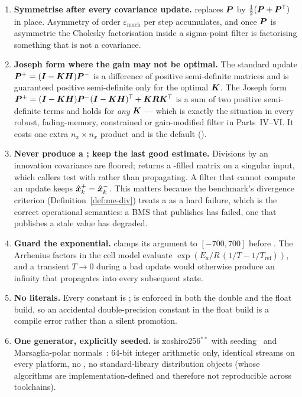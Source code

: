 \begin{enumerate}[leftmargin=*,topsep=2pt,itemsep=3pt]
\item \textbf{Symmetrise after every covariance update.}  replaces $\bm{P}$ by
$\frac12(\bm{P}+\bm{P}^{\mathsf{T}})$ in place. Asymmetry of order $\varepsilon_{\text{mach}}$ per step accumulates,
and once $\bm{P}$ is asymmetric the Cholesky factorisation inside a sigma-point filter is factorising
something that is not a covariance.

\item \textbf{Joseph form where the gain may not be optimal.} The standard update
$\bm{P}^{+} = (\bm{I}-\bm{K}\bm{H})\bm{P}^{-}$ is a difference of positive semi-definite matrices and is guaranteed
positive semi-definite only for the optimal $\bm{K}$. The Joseph
form~\cite{bucyjoseph1968} $\bm{P}^{+} = (\bm{I}-\bm{K}\bm{H})\bm{P}^{-}(\bm{I}-\bm{K}\bm{H})^{\mathsf{T}} + \bm{K}\bm{R}\bm{K}^{\mathsf{T}}$ is a sum of
two positive semi-definite terms and holds for \emph{any} $\bm{K}$ --- which is exactly the situation
in every robust, fading-memory, constrained or gain-modified filter in Parts~IV--VI. It costs one
extra $n_x\times n_x$ product and is the default ().

\item \textbf{Never produce a ; keep the last good estimate.} Divisions by an innovation
covariance are floored;  returns a -filled matrix on a singular input, which
callers test with  rather than propagating. A filter that cannot compute an
update keeps $\hat{\bm{x}}^{+}_k = \hat{\bm{x}}^{-}_k$. This matters because the benchmark's divergence criterion
(Definition~\ref{def:me-div}) treats a  as a hard failure, which is the correct
operational semantics: a BMS that publishes  has failed, one that publishes a stale value
has degraded.

\item \textbf{Guard the exponential.}  clamps its argument to $[-700,700]$ before
. The Arrhenius factors in the cell model evaluate
$\exp(E_a/R\,(1/T - 1/T_{\text{ref}}))$, and a transient $T\to0$ during a bad update would otherwise
produce an infinity that propagates into every subsequent state.

\item \textbf{No  literals.} Every constant is ;  is enforced in both the double and the float build, so an accidental
double-precision constant in the float build is a compile error rather than a silent promotion.

\item \textbf{One generator, explicitly seeded.}  is xoshiro256$^{**}$ with
 seeding~\cite{blackman2021xoshiro} and Marsaglia-polar
normals~\cite{marsaglia1964polar}: 64-bit integer arithmetic only, identical streams on every
platform, no , no standard-library distribution objects (whose algorithms
are implementation-defined and therefore not reproducible across toolchains).
\end{enumerate}

